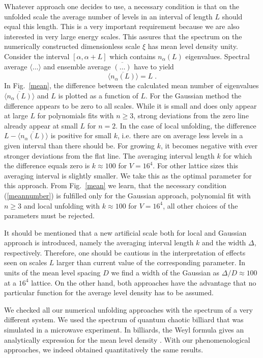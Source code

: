 Whatever approach one decides to use, a necessary condition is that on
the unfolded scale the average number of levels in an interval of
length $L$ should equal this length. This is a very important
requirement because we are also interested in very large energy
scales.  This assures that the spectrum on the numerically constructed
dimensionless scale $\xi$ has mean level density unity.  Consider the
interval $[\alpha,\alpha+L]$ which contains $n_\alpha(L)$ eigenvalues.
Spectral average $\langle\ldots\rangle$ and ensemble average
$\overline{(\ldots)}$ have to yield
\begin{equation}
\overline{\langle n_\alpha(L)\rangle}=L\;.
\label{meannumber}
\end{equation}
In Fig.~\ref{mean}, the difference between the calculated mean number
of eigenvalues $\overline{\langle n_\alpha(L)\rangle}$ and $L$ is
plotted as a function of $L$. For the Gaussian method the difference
appears to be zero to all scales. While it is small and does only
appear at large $L$ for polynomials fits with $n\geq3$, strong
deviations from the zero line already appear at small $L$ for $n=2$.
In the case of local unfolding, the difference $L-\overline{\langle
  n_\alpha(L)\rangle}$ is positive for small $k$, i.e.  there are on
average less levels in a given interval than there should be. For
growing $k$, it becomes negative with ever stronger deviations from
the flat line. The averaging interval length $k$ for which the
difference equals zero is $k\approx100$ for $V=16^4$. For other
lattice sizes this averaging interval is slightly smaller.  We take
this as the optimal parameter for this approach. {}From Fig.~\ref{mean}
we learn, that the necessary condition (\ref{meannumber}) is fulfilled
only for the Gaussian approach, polynomial fit with $n\geq3$ and local
unfolding with $k\approx100$ for $V=16^4$, all other choices of the
parameters must be rejected.

It should be mentioned that a new artificial scale both for local and
Gaussian approach is introduced, namely the averaging interval length
$k$ and the width $\Delta$, respectively. Therefore, one should be
cautious in the interpretation of effects seen on scales $L$ larger
than current value of the corresponding parameter. In units of the
mean level spacing $D$ we find a width of the Gaussian as
$\Delta/D\approx100$ at a $16^4$ lattice. On the other hand, both
approaches have the advantage that no particular function for the
average level density has to be assumed.

We checked all our numerical unfolding approaches with the spectrum of
a very different system. We used the spectrum of quantum chaotic
billiard that was simulated in a microwave experiment. In billiards,
the Weyl formula gives an analytically expression for the mean level
density \cite{graef92}. With our phenomenological approaches, we
indeed obtained quantitatively the same results.


